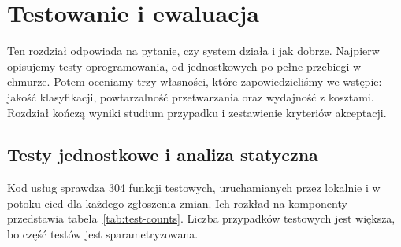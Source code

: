 \chapter{Testowanie i ewaluacja}
\label{chap:evaluation}


Ten rozdział odpowiada na pytanie, czy system działa i jak dobrze.
Najpierw opisujemy testy oprogramowania, od jednostkowych po pełne przebiegi w chmurze.
Potem oceniamy trzy własności, które zapowiedzieliśmy we wstępie: jakość klasyfikacji, powtarzalność przetwarzania oraz wydajność z kosztami.
Rozdział kończą wyniki studium przypadku i zestawienie kryteriów akceptacji.

\section{Testy jednostkowe i analiza statyczna}
\label{sec:eval-unit}

Kod usług sprawdza \num{304} funkcji testowych, uruchamianych przez  lokalnie i w potoku \ac{cicd} dla każdego zgłoszenia zmian.
Ich rozkład na komponenty przedstawia tabela~\ref{tab:test-counts}.
Liczba przypadków testowych jest większa, bo część testów jest sparametryzowana.

